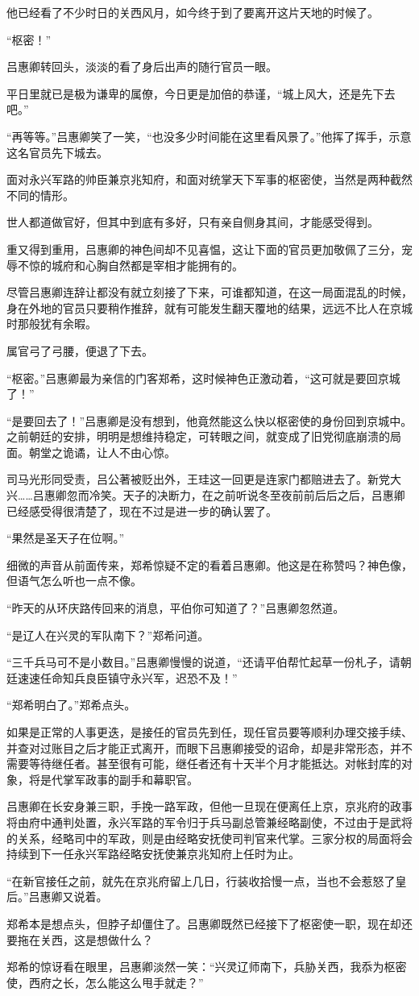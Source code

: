 他已经看了不少时日的关西风月，如今终于到了要离开这片天地的时候了。 

“枢密！” 

吕惠卿转回头，淡淡的看了身后出声的随行官员一眼。 

平日里就已是极为谦卑的属僚，今日更是加倍的恭谨，“城上风大，还是先下去吧。” 

“再等等。”吕惠卿笑了一笑，“也没多少时间能在这里看风景了。”他挥了挥手，示意这名官员先下城去。 

面对永兴军路的帅臣兼京兆知府，和面对统掌天下军事的枢密使，当然是两种截然不同的情形。 

世人都道做官好，但其中到底有多好，只有亲自侧身其间，才能感受得到。 

重又得到重用，吕惠卿的神色间却不见喜愠，这让下面的官员更加敬佩了三分，宠辱不惊的城府和心胸自然都是宰相才能拥有的。 

尽管吕惠卿连辞让都没有就立刻接了下来，可谁都知道，在这一局面混乱的时候，身在外地的官员只要稍作推辞，就有可能发生翻天覆地的结果，远远不比人在京城时那般犹有余暇。

属官弓了弓腰，便退了下去。 

“枢密。”吕惠卿最为亲信的门客郑希，这时候神色正激动着，“这可就是要回京城了！” 

“是要回去了！”吕惠卿是没有想到，他竟然能这么快以枢密使的身份回到京城中。之前朝廷的安排，明明是想维持稳定，可转眼之间，就变成了旧党彻底崩溃的局面。朝堂之诡谲，让人不由心惊。 

司马光形同受责，吕公著被贬出外，王珪这一回更是连家门都赔进去了。新党大兴……吕惠卿忽而冷笑。天子的决断力，在之前听说冬至夜前前后后之后，吕惠卿已经感受得很清楚了，现在不过是进一步的确认罢了。 

“果然是圣天子在位啊。” 

细微的声音从前面传来，郑希惊疑不定的看着吕惠卿。他这是在称赞吗？神色像，但语气怎么听也一点不像。 

“昨天的从环庆路传回来的消息，平伯你可知道了？”吕惠卿忽然道。 

“是辽人在兴灵的军队南下？”郑希问道。 

“三千兵马可不是小数目。”吕惠卿慢慢的说道，“还请平伯帮忙起草一份札子，请朝廷速速任命知兵良臣镇守永兴军，迟恐不及！” 

“郑希明白了。”郑希点头。 

如果是正常的人事更迭，是接任的官员先到任，现任官员要等顺利办理交接手续、并查对过账目之后才能正式离开，而眼下吕惠卿接受的诏命，却是非常形态，并不需要等待继任者。甚至很有可能，继任者还有十天半个月才能抵达。对帐封库的对象，将是代掌军政事的副手和幕职官。 

吕惠卿在长安身兼三职，手挽一路军政，但他一旦现在便离任上京，京兆府的政事将由府中通判处置，永兴军路的军令归于兵马副总管兼经略副使，不过由于是武将的关系，经略司中的军政，则是由经略安抚使司判官来代掌。三家分权的局面将会持续到下一任永兴军路经略安抚使兼京兆知府上任时为止。 

“在新官接任之前，就先在京兆府留上几日，行装收拾慢一点，当也不会惹怒了皇后。”吕惠卿又说着。 

郑希本是想点头，但脖子却僵住了。吕惠卿既然已经接下了枢密使一职，现在却还要拖在关西，这是想做什么？ 

郑希的惊讶看在眼里，吕惠卿淡然一笑：“兴灵辽师南下，兵胁关西，我忝为枢密使，西府之长，怎么能这么甩手就走？” 

